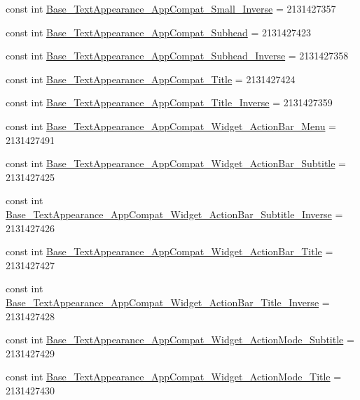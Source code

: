 \begin{CompactItemize}
\item 
const int \hyperlink{class__2doo_1_1_droid_1_1_resource_1_1_style_6cdb3b01e401faf238e4c80fa2ddd9ce}{Base\_\-TextAppearance\_\-AppCompat\_\-Small\_\-Inverse} = 2131427357
\item 
const int \hyperlink{class__2doo_1_1_droid_1_1_resource_1_1_style_3e09bc968483cb5a789554b23b342ee8}{Base\_\-TextAppearance\_\-AppCompat\_\-Subhead} = 2131427423
\item 
const int \hyperlink{class__2doo_1_1_droid_1_1_resource_1_1_style_9838d73bd4580b221c5b2034cf20772b}{Base\_\-TextAppearance\_\-AppCompat\_\-Subhead\_\-Inverse} = 2131427358
\item 
const int \hyperlink{class__2doo_1_1_droid_1_1_resource_1_1_style_cbee1f2c52ce4376baef154d1d64c1e3}{Base\_\-TextAppearance\_\-AppCompat\_\-Title} = 2131427424
\item 
const int \hyperlink{class__2doo_1_1_droid_1_1_resource_1_1_style_ecf7964930bce28c731c2c4124376cb5}{Base\_\-TextAppearance\_\-AppCompat\_\-Title\_\-Inverse} = 2131427359
\item 
const int \hyperlink{class__2doo_1_1_droid_1_1_resource_1_1_style_2ebea7b951501674241b8e95c1016a1b}{Base\_\-TextAppearance\_\-AppCompat\_\-Widget\_\-ActionBar\_\-Menu} = 2131427491
\item 
const int \hyperlink{class__2doo_1_1_droid_1_1_resource_1_1_style_70abb7f04fe163a6e9a54e2fe47a30ab}{Base\_\-TextAppearance\_\-AppCompat\_\-Widget\_\-ActionBar\_\-Subtitle} = 2131427425
\item 
const int \hyperlink{class__2doo_1_1_droid_1_1_resource_1_1_style_c4b96d84dc44b6ca9fc03127c0d9e680}{Base\_\-TextAppearance\_\-AppCompat\_\-Widget\_\-ActionBar\_\-Subtitle\_\-Inverse} = 2131427426
\item 
const int \hyperlink{class__2doo_1_1_droid_1_1_resource_1_1_style_0a40e861cdcd70f6f1b72ecec019822b}{Base\_\-TextAppearance\_\-AppCompat\_\-Widget\_\-ActionBar\_\-Title} = 2131427427
\item 
const int \hyperlink{class__2doo_1_1_droid_1_1_resource_1_1_style_8b18d1cf895bb75868de44142e22aa96}{Base\_\-TextAppearance\_\-AppCompat\_\-Widget\_\-ActionBar\_\-Title\_\-Inverse} = 2131427428
\item 
const int \hyperlink{class__2doo_1_1_droid_1_1_resource_1_1_style_79f7e58ae69be1954a7784950d601498}{Base\_\-TextAppearance\_\-AppCompat\_\-Widget\_\-ActionMode\_\-Subtitle} = 2131427429
\item 
const int \hyperlink{class__2doo_1_1_droid_1_1_resource_1_1_style_149fe39d3c66a450ec887f2cd4e37202}{Base\_\-TextAppearance\_\-AppCompat\_\-Widget\_\-ActionMode\_\-Title} = 2131427430

\end{CompactItemize}
